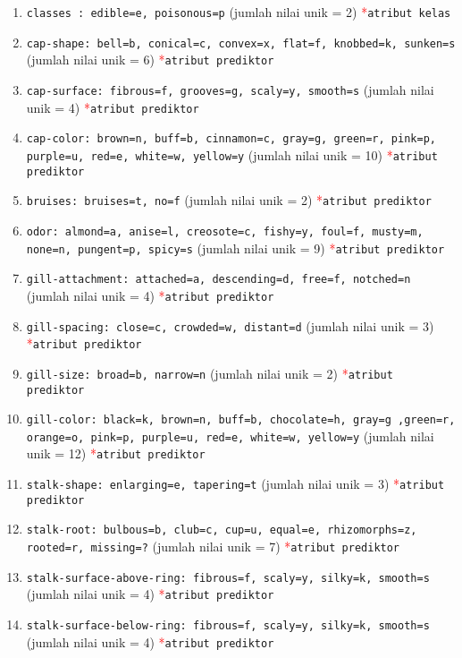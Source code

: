 \begin{enumerate}
	\item \texttt{classes : edible=e, poisonous=p} (jumlah nilai unik = 2) \textcolor{red}{*}\texttt{atribut kelas}
	\item \texttt{cap-shape: bell=b, conical=c, convex=x, flat=f, knobbed=k, sunken=s} (jumlah nilai unik = 6) \textcolor{red}{*}\texttt{atribut prediktor}
	\item \texttt{cap-surface: fibrous=f, grooves=g, scaly=y, smooth=s} (jumlah nilai unik = 4) \textcolor{red}{*}\texttt{atribut prediktor}
	\item \texttt{cap-color: brown=n, buff=b, cinnamon=c, gray=g, green=r, pink=p, purple=u, red=e, white=w, yellow=y} (jumlah nilai unik = 10) \textcolor{red}{*}\texttt{atribut prediktor}
	\item \texttt{bruises: bruises=t, no=f} (jumlah nilai unik = 2) \textcolor{red}{*}\texttt{atribut prediktor}
	\item \texttt{odor: almond=a, anise=l, creosote=c, fishy=y, foul=f, musty=m, none=n, pungent=p, spicy=s} (jumlah nilai unik = 9) \textcolor{red}{*}\texttt{atribut prediktor}
	\item \texttt{gill-attachment: attached=a, descending=d, free=f, notched=n} (jumlah nilai unik = 4) \textcolor{red}{*}\texttt{atribut prediktor}
	\item \texttt{gill-spacing: close=c, crowded=w, distant=d} (jumlah nilai unik = 3) \textcolor{red}{*}\texttt{atribut prediktor}
	\item \texttt{gill-size: broad=b, narrow=n} (jumlah nilai unik = 2) \textcolor{red}{*}\texttt{atribut prediktor}
	\item \texttt{gill-color: black=k, brown=n, buff=b, chocolate=h, gray=g ,green=r, orange=o, pink=p, purple=u, red=e, white=w, yellow=y} (jumlah nilai unik = 12) \textcolor{red}{*}\texttt{atribut prediktor}
	\item \texttt{stalk-shape: enlarging=e, tapering=t} (jumlah nilai unik = 3) \textcolor{red}{*}\texttt{atribut prediktor}
	\item \texttt{stalk-root: bulbous=b, club=c, cup=u, equal=e, rhizomorphs=z, rooted=r, missing=?} (jumlah nilai unik = 7) \textcolor{red}{*}\texttt{atribut prediktor}
	\item \texttt{stalk-surface-above-ring: fibrous=f, scaly=y, silky=k, smooth=s} (jumlah nilai unik = 4) \textcolor{red}{*}\texttt{atribut prediktor}
	\item \texttt{stalk-surface-below-ring: fibrous=f, scaly=y, silky=k, smooth=s} (jumlah nilai unik = 4) \textcolor{red}{*}\texttt{atribut prediktor}

\end{enumerate}
